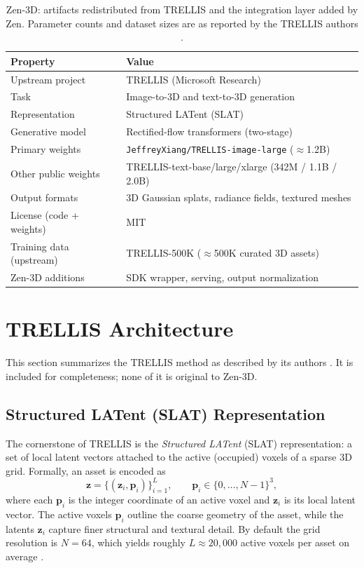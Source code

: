 \documentclass[11pt,a4paper]{article}
\begin{document}
\begin{table}[H]
\centering
\begin{tabular}{ll}
\toprule
\textbf{Property} & \textbf{Value} \\
\midrule
Upstream project & TRELLIS (Microsoft Research) \cite{xiang2024trellis,trellis_repo} \\
Task & Image-to-3D and text-to-3D generation \\
Representation & Structured LATent (SLAT) \\
Generative model & Rectified-flow transformers (two-stage) \\
Primary weights & \texttt{JeffreyXiang/TRELLIS-image-large} ($\approx$1.2B) \\
Other public weights & TRELLIS-text-base/large/xlarge (342M / 1.1B / 2.0B) \\
Output formats & 3D Gaussian splats, radiance fields, textured meshes \\
License (code + weights) & MIT \cite{trellis_repo} \\
Training data (upstream) & TRELLIS-500K ($\approx$500K curated 3D assets) \\
Zen-3D additions & SDK wrapper, serving, output normalization \\
\bottomrule
\end{tabular}
\caption{Zen-3D: artifacts redistributed from TRELLIS and the integration layer added by Zen.
Parameter counts and dataset sizes are as reported by the TRELLIS authors
\cite{xiang2024trellis}.}
\end{table}

\section{TRELLIS Architecture}

This section summarizes the TRELLIS method as described by its authors \cite{xiang2024trellis}.
It is included for completeness; none of it is original to Zen-3D.

\subsection{Structured LATent (SLAT) Representation}

The cornerstone of TRELLIS is the \emph{Structured LATent} (SLAT) representation: a set of local
latent vectors attached to the active (occupied) voxels of a sparse 3D grid. Formally, an asset
is encoded as
\begin{equation}
    \mathbf{z} = \{(\boldsymbol{z}_i, \boldsymbol{p}_i)\}_{i=1}^{L},
    \qquad \boldsymbol{p}_i \in \{0,\dots,N-1\}^3,
\end{equation}
where each $\boldsymbol{p}_i$ is the integer coordinate of an active voxel and $\boldsymbol{z}_i$
is its local latent vector. The active voxels $\boldsymbol{p}_i$ outline the coarse geometry of
the asset, while the latents $\boldsymbol{z}_i$ capture finer structural and textural detail. By
default the grid resolution is $N = 64$, which yields roughly $L \approx 20{,}000$ active voxels
per asset on average \cite{xiang2024trellis}.
\end{document}
